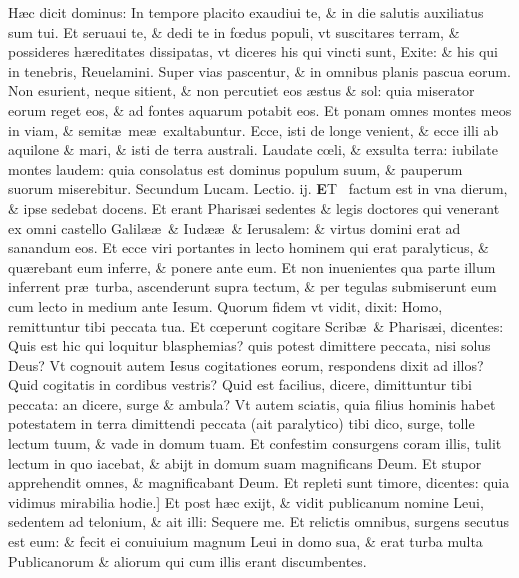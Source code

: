 \documentclass[a5paper,10pt]{book}
\def\leftmarginnote{%
	\lrmarginnote{\hskip -\marginparsep \hskip -6.5em}}
\def\rightmarginnote{%
	\lrmarginnote{\hskip\columnwidth \hskip -1em}}
\def\ae{æ}
\def\oe{œ}
\begin{document}
\begin{multicols*}{2}
H\ae c\leftmarginnote{\begin{flushright}B\end{flushright}} dicit dominus: In tempore placito exaudiui te, \& in die salutis auxiliatus sum tui.
Et seruaui te, \& dedi te in f\oe dus populi, vt suscitares terram, \& possideres h\ae reditates dissipatas, vt diceres his qui vincti sunt, Exite: \& his qui in tenebris, Reuelamini.
Super vias pascentur, \& in omnibus planis pascua eorum.
Non esurient, neque sitient, \& non percutiet eos \ae stus \& sol: quia miserator eorum reget eos, \& ad fontes aquarum potabit eos.
Et ponam omnes montes meos in viam, \& semit\ae \ me\ae \ exaltabuntur.
Ecce, isti de longe venient, \& ecce illi ab aquilone \& mari, \& isti de terra australi.
Laudate c\oe li, \& exsulta terra: iubilate montes laudem: quia consolatus est dominus populum suum, \& pauperum suorum miserebitur.
\newline \color{red} Secundum Lucam. \hfill Lectio. ij. \color{black}
\vspace{-.25em}
\lettrine[lines=2]{\bfseries \color{red} E}{}T \textdagger \ factum\leftmarginnote{\begin{flushright}c.5.c\end{flushright}} est in vna dierum, \& ipse sedebat docens.
Et erant Pharis\ae i sedentes \& legis doctores qui venerant ex omni castello Galil\ae \ae \ \& Iud\ae \ae \ \& Ierusalem: \& virtus domini erat ad sanandum eos.
Et ecce viri portantes in lecto hominem qui
erat paralyticus, \& qu\ae rebant eum inferre, \& ponere ante eum.
Et non inuenientes qua parte illum inferrent pr\ae \ turba, ascenderunt supra tectum, \& per tegulas submiserunt eum cum lecto in medium ante Iesum.
Quorum fidem vt vidit, dixit: Homo, remittuntur tibi peccata tua.
Et c\oe perunt cogitare Scrib\ae \ \& Pharis\ae i, dicentes: Quis est hic qui loquitur blasphemias? quis potest dimittere peccata, nisi solus Deus?
Vt cognouit autem Iesus cogitationes eorum, respondens dixit ad illos? Quid cogitatis in cordibus vestris?
Quid est facilius, dicere, dimittuntur tibi peccata: an dicere, surge \& ambula?
Vt autem sciatis, quia filius hominis habet potestatem in terra dimittendi peccata (ait paralytico) tibi dico, surge, tolle lectum tuum, \& vade in domum tuam.
Et confestim consurgens coram illis, tulit lectum in quo iacebat, \& abijt in domum suam magnificans Deum.
Et stupor apprehendit omnes, \& magnificabant Deum.
Et repleti sunt timore, dicentes: quia vidimus mirabilia hodie.]
Et\rightmarginnote{D} post h\ae c exijt, \& vidit publicanum nomine Leui, sedentem ad telonium, \& ait illi: Sequere me. Et relictis omnibus, surgens secutus est eum: \& fecit ei conuiuium magnum Leui in domo sua, \& erat turba multa Publicanorum \& aliorum qui cum illis erant discumbentes.

\end{multicols*}
\end{document}
